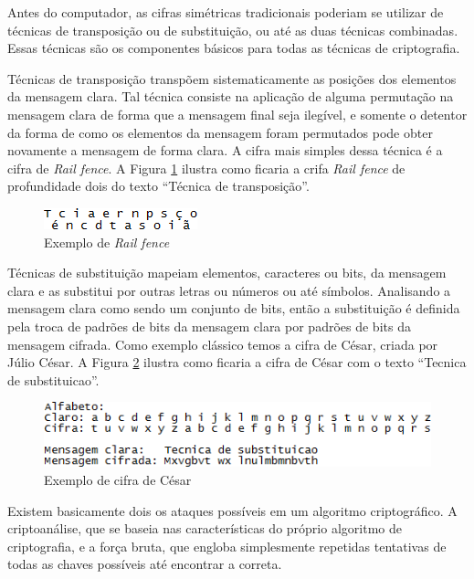Antes do computador, as cifras simétricas tradicionais poderiam se utilizar de técnicas de transposição ou de substituição, ou até as duas técnicas combinadas. Essas técnicas são os componentes básicos para todas as técnicas de criptografia.

Técnicas de transposição transpõem sistematicamente as posições dos elementos da mensagem clara. Tal técnica consiste na aplicação de alguma permutação na mensagem clara de forma que a mensagem final seja ilegível, e somente o detentor da forma de como os elementos da mensagem foram permutados pode obter novamente a mensagem de forma clara. A cifra mais simples dessa técnica é a cifra de \textit{Rail fence}. A Figura \ref{fig:railfence} ilustra como ficaria a crifa \textit{Rail fence} de profundidade dois do texto “Técnica de transposição”.

\begin{figure}[H]
    \centering
    \caption{Exemplo de \textit{Rail fence}}
    \label{fig:railfence}
    \includegraphics{Figuras/RailFence.png}
\end{figure}

Técnicas de substituição mapeiam elementos, caracteres ou bits, da mensagem clara e as substitui por outras letras ou números ou até símbolos. Analisando a mensagem clara como sendo um conjunto de bits, então a substituição é definida pela troca de padrões de bits da mensagem clara por padrões de bits da mensagem cifrada. Como exemplo clássico temos a cifra de César, criada por Júlio César. A Figura \ref{fig:cifradecesar} ilustra como ficaria a cifra de César com o texto “Tecnica de substituicao”.

\begin{figure}[H]
    \centering
    \caption{Exemplo de cifra de César}
    \label{fig:cifradecesar}
    \includegraphics{Figuras/CifraDeCesar.png}
\end{figure}

Existem basicamente dois os ataques possíveis em um algoritmo criptográfico. A criptoanálise, que se baseia nas características do próprio algoritmo de criptografia, e a força bruta, que engloba simplesmente repetidas tentativas de todas as chaves possíveis até encontrar a correta.

